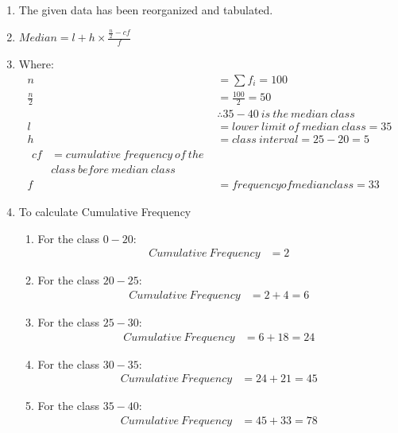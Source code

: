 \renewcommand{\theequation}{\theenumi}

\begin{enumerate}

\item The given data has been reorganized and tabulated.

\item $Median = l + h \times \frac{\frac{n}{2} - cf}{f} $

\item Where:
\begin{align*}
n &= \sum f_i = 100 \\
\frac{n}{2} &= \frac{100}{2} = 50\\
&\therefore 35-40\ is\ the\ median\ class\\
l &= lower\ limit\ of\ median\ class = 35\\
h &= class\ interval = 25 - 20 = 5 \\
\begin{split}
cf &= cumulative\ frequency\ of\ the \\
&class\ before\ median\ class 
\end{split}\\
f &= frequency of median class = 33
\end{align*}

\item To calculate Cumulative Frequency 
\begin{enumerate}

\item For the class $0-20$:
\begin{align*}
Cumulative\ Frequency &= 2
\end{align*}

\item For the class $20-25$:
\begin{align*}
Cumulative\ Frequency &= 2 + 4 = 6
\end{align*}

\item For the class $25-30$:
\begin{align*}
Cumulative\ Frequency &= 6 + 18 = 24 
\end{align*}

\item For the class $30-35$:
\begin{align*}
Cumulative\ Frequency &= 24 + 21 = 45  
\end{align*}

\item For the class $35-40$:
\begin{align*}
Cumulative\ Frequency &= 45 + 33 = 78
\end{align*}


\end{enumerate}
\end{enumerate}
